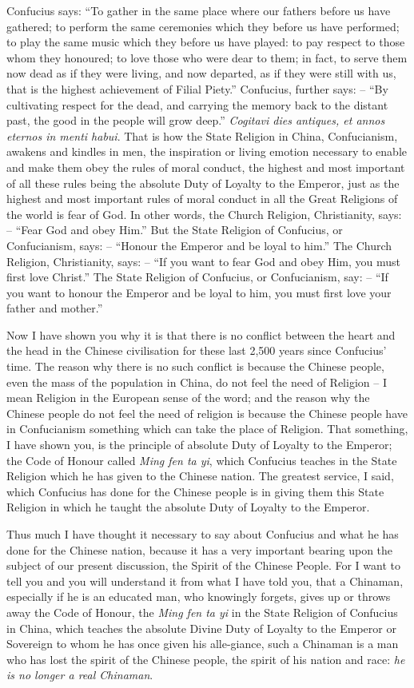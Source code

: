 Confucius says: ``To gather in the same place where our fathers before us have gathered;
to perform the same ceremonies which they before us have performed;
to play the same music which they before us have played:
to pay respect to those whom they honoured;
to love those who were dear to them;
in fact, to serve them now dead as if they were living,
and now departed, as if they were still with us, that is the highest achievement of Filial Piety.''
Confucius, further says: -- ``By cultivating respect for the dead, and carrying the memory back to the distant past, the good in the people will grow deep.''
\emph{Cogitavi dies antiques, et annos eternos in menti habui}.
That is how the State Religion in China, Confucianism, awakens and kindles in men,
the inspiration or living emotion necessary to enable and make them obey the rules of moral conduct,
the highest and most important of all these rules being the absolute Duty of Loyalty to the Emperor,
just as the highest and most important rules of moral conduct in all the Great Religions of the world is fear of God.
In other words, the Church Religion, Christianity, says: -- ``Fear God and obey Him.''
But the State Religion of Confucius, or Confucianism, says: -- ``Honour the Emperor and be loyal to him.''
The Church Religion, Christianity, says: -- ``If you want to fear God and obey Him, you must first love Christ.''
The State Religion of Confucius, or Confucianism, say: -- ``If you want to honour the Emperor and be loyal to him, you must first love your father and mother.''

Now I have shown you why it is that there is no conflict between the heart and the head in the Chinese civilisation for these last 2,500 years since Confucius' time.
The reason why there is no such conflict is because the Chinese people, even the mass of the population in China, do not feel the need of Religion
-- I mean Religion in the European sense of the word; and the reason why the Chinese people do not feel the need of religion is because the Chinese people have in Confucianism something which can take the place of Religion.
That something, I have shown you, is the principle of absolute Duty of Loyalty to the Emperor; the Code of Honour called \emph{Ming fen ta yi},
which Confucius teaches in the State Religion which he has given to the Chinese nation.
The greatest service, I said, which Confucius has done for the Chinese people is in giving them this State Religion in which he taught the absolute Duty of Loyalty to the Emperor.

Thus much I have thought it necessary to say about Confucius and what he has done for the Chinese nation, because it has a very important bearing upon the subject of our present discussion,
the Spirit of the Chinese People.
For I want to tell you and you will understand it from what I have told you, that a Chinaman,
especially if he is an educated man, who knowingly forgets, gives up or throws away the Code of Honour,
the \emph{Ming fen ta yi} in the State Religion of Confucius in China,
which teaches the absolute Divine Duty of Loyalty to the Emperor or Sovereign to whom he has once given his alle-giance,
such a Chinaman is a man who has lost the spirit of the Chinese people,
the spirit of his nation and race: \emph{he is no longer a real Chinaman}.

